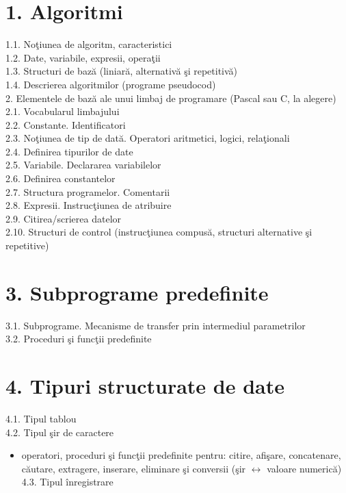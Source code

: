 \documentclass[10pt]{article}
\begin{document}
\section*{1. Algoritmi}
1.1. Noţiunea de algoritm, caracteristici\\
1.2. Date, variabile, expresii, operaţii\\
1.3. Structuri de bază (liniară, alternativă şi repetitivă)\\
1.4. Descrierea algoritmilor (programe pseudocod)\\
2. Elementele de bază ale unui limbaj de programare (Pascal sau C, la alegere)\\
2.1. Vocabularul limbajului\\
2.2. Constante. Identificatori\\
2.3. Noţiunea de tip de dată. Operatori aritmetici, logici, relaţionali\\
2.4. Definirea tipurilor de date\\
2.5. Variabile. Declararea variabilelor\\
2.6. Definirea constantelor\\
2.7. Structura programelor. Comentarii\\
2.8. Expresii. Instrucţiunea de atribuire\\
2.9. Citirea/scrierea datelor\\
2.10. Structuri de control (instrucţiunea compusă, structuri alternative şi repetitive)

\section*{3. Subprograme predefinite}
3.1. Subprograme. Mecanisme de transfer prin intermediul parametrilor\\
3.2. Proceduri şi funcţii predefinite

\section*{4. Tipuri structurate de date}
4.1. Tipul tablou\\
4.2. Tipul şir de caractere

\begin{itemize}
  \item operatori, proceduri şi funcţii predefinite pentru: citire, afişare, concatenare, căutare, extragere, inserare, eliminare şi conversii (şir $\leftrightarrow$ valoare numerică)\\
4.3. Tipul înregistrare
\end{itemize}
\end{document}

